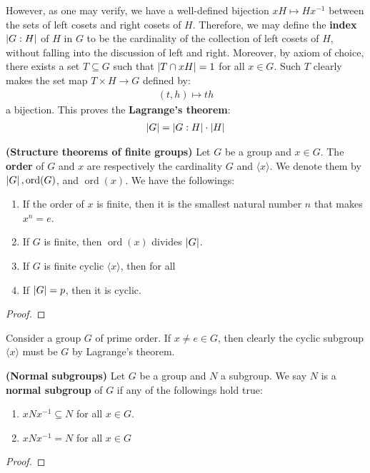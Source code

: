 \documentclass{report}
\begin{document}
However, as one may verify, we have a well-defined bijection $xH\mapsto Hx^{-1}$ between the sets of left cosets and right cosets of $H$. Therefore, we may define the \textbf{index} $\left|G:H\right|$ of $H$ in  $G$ to be the cardinality of the collection of left cosets of $H$, without falling into the discussion of left and right. Moreover, by axiom of choice, there exists a set $T\subseteq G$ such that $\left|T\cap xH\right|=1$ for all $x \in G$. Such $T$ clearly makes the set map  $T \times H \rightarrow G$ defined by: 
\begin{align*}
  (t,h)\mapsto th
\end{align*}
a bijection. This proves the \textbf{Lagrange's theorem}: 
\begin{align*}
\left|G\right|= \left|G:H\right| \cdot \left|H\right|
\end{align*}
\begin{theorem}
\textbf{(Structure theorems of finite groups)} Let $G$ be a group and $x \in G$. The \textbf{order} of $G$ and  $x$ are respectively the cardinality $G$ and  $\langle x\rangle $. We denote them by $\left|G\right|,\operatorname{ord}(G)$, and $\operatorname{ord}(x)$. We have the followings: 
\begin{enumerate}[label=(\roman*)]
  \item If the order of $x$ is finite, then it is the smallest natural number $n$ that makes $x^n=e$. 
  \item  If $G$ is finite, then $\operatorname{ord}(x)$ divides $\left|G\right|$. 
  \item If $G$ is finite cyclic $\langle x\rangle $, then for all  
  \item If $\left|G\right|=p$, then it is cyclic. 
\end{enumerate}




\end{theorem}
\begin{proof}

\end{proof}





Consider a group $G$ of prime order. If $x \neq e\in G$, then clearly the cyclic subgroup $\langle x\rangle $ must be $G$ by Lagrange's theorem.  



\begin{equiv_def}
\textbf{(Normal subgroups)} Let $G$ be a group and $N$ a subgroup. We say $N$ is a \textbf{normal subgroup} of $G$ if any of the followings hold true: 
\begin{enumerate}[label=(\roman*)]
  \item $xNx^{-1}\subseteq N$ for all $x\in G$.   
  \item $xN x^{-1}=N$ for all $x \in G$ 
\end{enumerate}
\end{equiv_def}
\begin{proof}

\end{proof}
\end{document}
